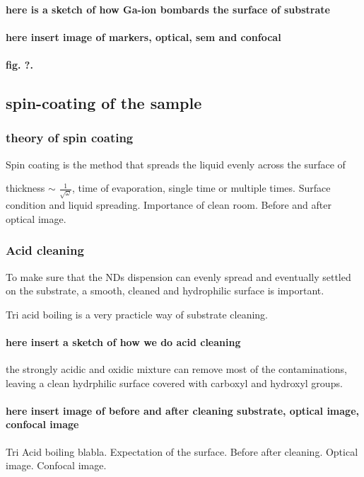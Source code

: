 \paragraph{here is a sketch of how Ga-ion bombards the surface of substrate}
\paragraph{here insert image of markers, optical, sem and confocal}
\paragraph{fig. ?.  }



\subsection{spin-coating of the sample}
\subsubsection{theory of spin coating} 
Spin coating is the method that spreads the liquid evenly across the surface of 

thickness $\sim$ $\frac{1}{\sqrt{\omega}}$, time of evaporation, single time or multiple times. Surface condition and liquid spreading. Importance of clean room. Before and after optical image.
\subsubsection{Acid cleaning}
To make sure that the NDs dispension can evenly spread and eventually settled on the substrate, a smooth, cleaned and hydrophilic surface is important.

Tri acid boiling is a very practicle way of substrate cleaning.

\paragraph{here insert a sketch of how we do acid cleaning} 

the strongly acidic and oxidic mixture can remove most of the contaminations, leaving a clean hydrphilic surface covered with carboxyl and hydroxyl groups.

\paragraph {here insert image of before and after cleaning substrate, optical image, confocal image }
Tri Acid boiling blabla. Expectation of the surface. Before after cleaning. Optical image. Confocal image.

